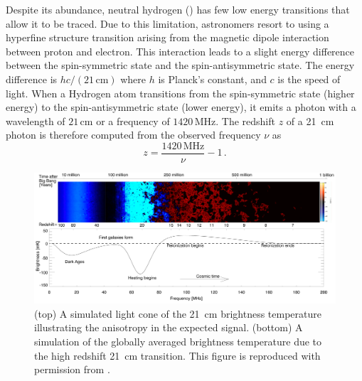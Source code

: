 \begin{bibunit}
Despite its abundance, neutral hydrogen () has few low energy transitions that allow it to
be traced.  Due to this limitation, astronomers resort to using a hyperfine structure transition
arising from the magnetic dipole interaction between proton and electron. This interaction leads to
a slight energy difference between the spin-symmetric state and the spin-antisymmetric state. The
energy difference is $hc / (21\,\text{cm})$ where $h$ is Planck's constant, and $c$ is the speed of
light.  When a Hydrogen atom transitions from the spin-symmetric state (higher energy) to the
spin-antisymmetric state (lower energy), it emits a photon with a wavelength of $21\,\text{cm}$ or a
frequency of $1420\,\text{MHz}$. The redshift $z$ of a 21~cm photon is therefore computed from the
observed frequency $\nu$ as
\begin{equation}
    z = \frac{1420\,\text{MHz}}{\nu} - 1\,.
\end{equation}

\begin{figure}[t]
    \centering
    \includegraphics[width=\textwidth]{figures/chapter1/pritchard-2012-global-signal}
    \caption{
        (top) A simulated light cone of the 21~cm brightness temperature illustrating the
        anisotropy in the expected signal.
        (bottom) A simulation of the globally averaged brightness temperature due to the high
        redshift 21~cm transition.
        This figure is reproduced with permission from \citet{2012RPPh...75h6901P}.
    }
    \label{fig:pritchard-global-signal}
\end{figure}


\end{bibunit}
